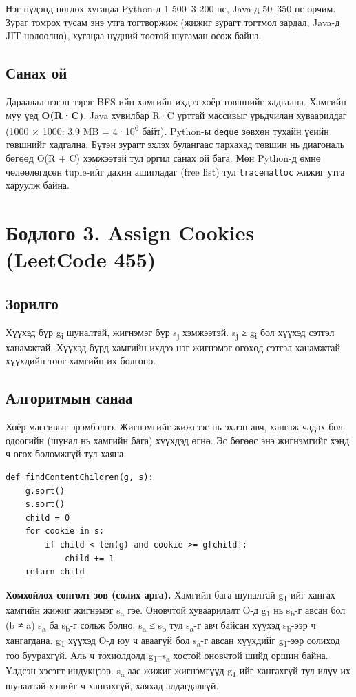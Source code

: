 \documentclass[11pt,a4paper]{article}
\renewcommand{\_}{\oldunderscore\allowbreak}
\begin{document}
Нэг нүдэнд ногдох хугацаа Python-д 1 500–3 200 нс, Java-д 50–350 нс орчим. Зураг томрох тусам энэ утга тогтворжиж (жижиг зурагт тогтмол зардал, Java-д JIT нөлөөлнө), хугацаа нүдний тоотой шугаман өсөж байна.

\subsection{Санах ой}
Дараалал нэгэн зэрэг BFS-ийн хамгийн ихдээ хоёр төвшнийг хадгална. Хамгийн муу үед \textbf{O(R·C)}. Java хувилбар R·C урттай массивыг урьдчилан хуваарилдаг (1000 × 1000: 3.9 MB = 4·10\textsuperscript{6} байт). Python-ы \texttt{deque} зөвхөн тухайн үеийн төвшнийг хадгална. Бүтэн зурагт эхлэх булангаас тархахад төвшин нь диагональ бөгөөд O(R + C) хэмжээтэй тул оргил санах ой бага. Мөн Python-д өмнө чөлөөлөгдсөн tuple-ийг дахин ашигладаг (free list) тул \texttt{tracemalloc} жижиг утга харуулж байна.

\section{Бодлого 3. Assign Cookies (LeetCode 455)}

\subsection{Зорилго}
Хүүхэд бүр g\textsubscript{i} шуналтай, жигнэмэг бүр s\textsubscript{j} хэмжээтэй. s\textsubscript{j} ≥ g\textsubscript{i} бол хүүхэд сэтгэл ханамжтай. Хүүхэд бүрд хамгийн ихдээ нэг жигнэмэг өгөхөд сэтгэл ханамжтай хүүхдийн тоог хамгийн их болгоно.

\subsection{Алгоритмын санаа}
Хоёр массивыг эрэмбэлнэ. Жигнэмгийг жижгээс нь эхлэн авч, хангаж чадах бол одоогийн (шунал нь хамгийн бага) хүүхдэд өгнө. Эс бөгөөс энэ жигнэмгийг хэнд ч өгөх боломжгүй тул хаяна.

\begin{Verbatim}
def findContentChildren(g, s):
    g.sort()
    s.sort()
    child = 0
    for cookie in s:
        if child < len(g) and cookie >= g[child]:
            child += 1
    return child
\end{Verbatim}

\textbf{Хомхойлох сонголт зөв (солих арга).} Хамгийн бага шуналтай g\textsubscript{1}-ийг хангах хамгийн жижиг жигнэмэг s\textsubscript{a} гэе. Оновчтой хуваарилалт O-д g\textsubscript{1} нь s\textsubscript{b}-г авсан бол (b ≠ a) s\textsubscript{a} ба s\textsubscript{b}-г сольж болно: s\textsubscript{a} ≤ s\textsubscript{b} тул s\textsubscript{a}-г авч байсан хүүхэд s\textsubscript{b}-ээр ч хангагдана. g\textsubscript{1} хүүхэд O-д юу ч аваагүй бол s\textsubscript{a}-г авсан хүүхдийг g\textsubscript{1}-ээр солиход тоо буурахгүй. Аль ч тохиолдолд g\textsubscript{1}–s\textsubscript{a} хостой оновчтой шийд оршин байна. Үлдсэн хэсэгт индукцээр. s\textsubscript{a}-аас жижиг жигнэмгүүд g\textsubscript{1}-ийг хангахгүй тул илүү их шуналтай хэнийг ч хангахгүй, хаяхад алдагдалгүй.
\end{document}
